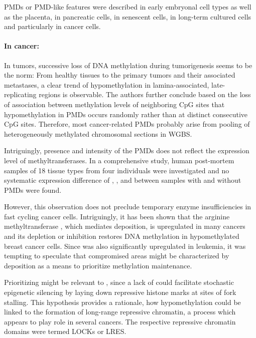 PMDs or PMD-like features were described in early embryonal cell types\cite{Shirane2016} as well as the placenta\cite{Schroeder2013a}, in pancreatic cells\cite{Schultz2015}, in senescent cells\cite{Cruickshanks2013}, in long-term cultured cells\cite{Ziller2013} and particularly in cancer cells\cite{Hansen2011,Berman2012,Timp2014,Vidal2017}.  

\paragraph{In cancer:} In tumors, successive loss of DNA methylation during tumorigenesis seems to be the norm: From healthy tissues to the primary tumors and their associated metastases, a clear trend of hypomethylation in lamina-associated, late-replicating regions is observable\cite{Vidal2017}. The authors further conclude based on the loss of association between methylation levels of neighboring CpG sites that hypomethylation in PMDs occurs randomly rather than at distinct consecutive CpG sites\cite{Vidal2017}. Therefore, most cancer-related PMDs probably arise from pooling of heterogeneously methylated chromosomal sections in WGBS. 

Intriguingly, presence and intensity of the PMDs does not reflect the expression level of methyltransferases. In a comprehensive study, human post-mortem samples of 18 tissue types from four individuals were investigated and no systematic expression difference of , ,  and  between samples with and without PMDs were found\cite{Schultz2015}.  

However, this observation does not preclude temporary enzyme insufficiencies in fast cycling cancer cells. Intriguingly, it has been shown that the arginine methyltransferase , which mediates \histwoarg deposition, is upregulated in many cancers and its depletion or inhibition restores DNA methylation in hypomethylated breast cancer cells\cite{Veland2017}. Since  was also significantly upregulated in \dnmtchip \mllafnine leukemia, it was tempting to speculate that compromised areas might be characterized by \histwoarg deposition as a means to prioritize methylation maintenance.

Prioritizing might be relevant to \dnmtchip, since a lack of  could facilitate stochastic epigenetic silencing by laying down repressive histone marks at sites of fork stalling\cite{Jasencakova2010a,Nikolov2016}. This hypothesis provides a rationale, how hypomethylation could be linked to the formation of long-range repressive chromatin\cite{Hon2012}, a process which appears to play role in several cancers. The respective repressive chromatin domains were termed LOCKs\cite{Timp2013} or LRES\cite{Clark2007}. 

